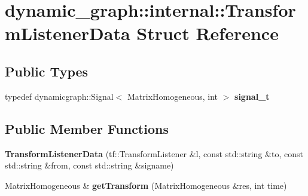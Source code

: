 \hypertarget{structdynamic__graph_1_1internal_1_1TransformListenerData}{}\section{dynamic\+\_\+graph\+:\+:internal\+:\+:Transform\+Listener\+Data Struct Reference}
\label{structdynamic__graph_1_1internal_1_1TransformListenerData}
\subsection*{Public Types}
\begin{DoxyCompactItemize}
\item 
typedef dynamicgraph\+::\+Signal$<$ Matrix\+Homogeneous, int $>$ {\bfseries signal\+\_\+t}\hypertarget{structdynamic__graph_1_1internal_1_1TransformListenerData_ac6a6174f637f20a2fd08505f8384ffeb}{}\label{structdynamic__graph_1_1internal_1_1TransformListenerData_ac6a6174f637f20a2fd08505f8384ffeb}

\end{DoxyCompactItemize}
\subsection*{Public Member Functions}
\begin{DoxyCompactItemize}
\item 
{\bfseries Transform\+Listener\+Data} (tf\+::\+Transform\+Listener \&l, const std\+::string \&to, const std\+::string \&from, const std\+::string \&signame)\hypertarget{structdynamic__graph_1_1internal_1_1TransformListenerData_aea741575414599c63429b551de15c17b}{}\label{structdynamic__graph_1_1internal_1_1TransformListenerData_aea741575414599c63429b551de15c17b}

\item 
Matrix\+Homogeneous \& {\bfseries get\+Transform} (Matrix\+Homogeneous \&res, int time)\hypertarget{structdynamic__graph_1_1internal_1_1TransformListenerData_abbb4ba6133c60d3b39a1a078acce7bb2}{}\label{structdynamic__graph_1_1internal_1_1TransformListenerData_abbb4ba6133c60d3b39a1a078acce7bb2}

\end{DoxyCompactItemize}
